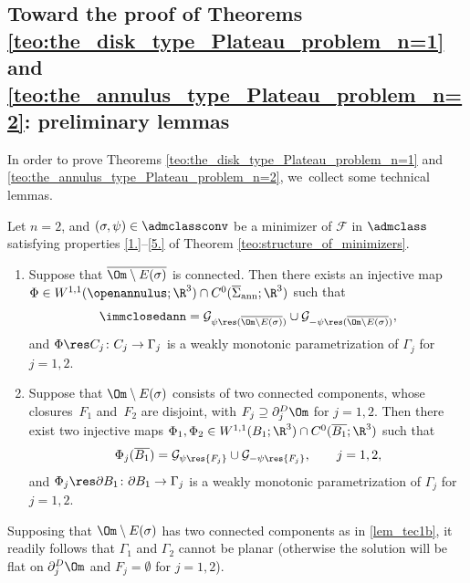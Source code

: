 \subsection{Toward the proof of Theorems \ref{teo:the_disk_type_Plateau_problem_n=1}
and \ref{teo:the_annulus_type_Plateau_problem_n=2}: preliminary lemmas}

In order to prove Theorems \ref{teo:the_disk_type_Plateau_problem_n=1} and
\ref{teo:the_annulus_type_Plateau_problem_n=2}, we~collect some technical lemmas.

\begin{lemma}[Graphicality of minimizers for $n=2$]\label{lem_tec1}
Let $n=2$, and $(\sigma,\psi)\in\admclassconv$ be a minimizer
of $\mathcal F$ in
$\admclass$
satisfying properties \ref{1.}--\ref{5.} of Theorem \ref{teo:structure_of_minimizers}.
\begin{enumerate}[{\rm(a)},wide]
\item\label{lem_tec1a}
Suppose that $\overline{\Om\setminus E(\sigma)}$ is connected.
Then there exists an injective map $\Phi\in W^{1,1}(\openannulus;\R^3)\cap C^0(\overline{\Sigma}_{\mathrm{ann}};\R^3)$ such that
\[
\immclosedann=\mathcal G_{\psi\res (\overline{\Om\setminus E(\sigma)})}\cup\mathcal G_{-\psi\res (\overline{\Om\setminus E(\sigma)})},
\]
and $\Phi\res C_j\colon C_j\to \Gamma_j$ is a weakly monotonic parametrization of $\Gamma_j$ for $j=1,2$.
\item\label{lem_tec1b}
Suppose that $\Om\setminus E(\sigma)$
consists of two connected components, whose closures~$F_1$ and~$F_2$ are disjoint,
with
$F_j \supseteq \partial^D_j\Om$ for $j=1,2$.
Then there exist two injective maps $\Phi_1,\Phi_2\in W^{1,1}(B_1;\R^3)\cap C^0(\overline{B_1};\R^3)$ such that
\[
\Phi_j(\overline{B_1})=\mathcal G_{\psi\res {F_j}}
\cup\mathcal G_{-\psi\res{F_j}},\qquad j=1,2,
\]
and $\Phi_j\res \partial B_1\colon\partial B_1\to \Gamma_j$ is a weakly monotonic parametrization of $\Gamma_j$ for $j=1,2$.
\end{enumerate}
\end{lemma}
Supposing that $\Om\setminus E(\sigma)$
has two connected components as in \ref{lem_tec1b}, it readily follows that $\Gamma_1$
and $\Gamma_2$
cannot be planar
(otherwise the solution will be flat on $\partial^D_j\Om$ and $F_j=\emptyset$
for $j=1,2$).

